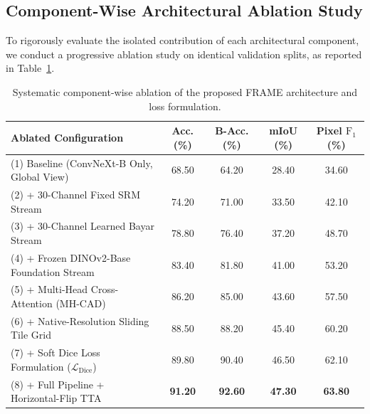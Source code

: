 \subsection{Component-Wise Architectural Ablation Study}
To rigorously evaluate the isolated contribution of each architectural component, we conduct a progressive ablation study on identical validation splits, as reported in Table~\ref{tab:ablation}.

\begin{table}[t]
\centering\small
\caption{Systematic component-wise ablation of the proposed FRAME architecture and loss formulation.}
\label{tab:ablation}
\begin{tabular}{@{}lcccc@{}}
\toprule
Ablated Configuration & Acc. (\%) & B-Acc. (\%) & mIoU (\%) & Pixel $\mathrm{F}_1$ (\%) \\
\midrule
(1) Baseline (ConvNeXt-B Only, Global View) & 68.50 & 64.20 & 28.40 & 34.60 \\
(2) + 30-Channel Fixed SRM Stream & 74.20 & 71.00 & 33.50 & 42.10 \\
(3) + 30-Channel Learned Bayar Stream & 78.80 & 76.40 & 37.20 & 48.70 \\
(4) + Frozen DINOv2-Base Foundation Stream & 83.40 & 81.80 & 41.00 & 53.20 \\
(5) + Multi-Head Cross-Attention (MH-CAD) & 86.20 & 85.00 & 43.60 & 57.50 \\
(6) + Native-Resolution Sliding Tile Grid & 88.50 & 88.20 & 45.40 & 60.20 \\
(7) + Soft Dice Loss Formulation ($\mathcal{L}_{\mathrm{Dice}}$) & 89.80 & 90.40 & 46.50 & 62.10 \\
(8) + Full Pipeline + Horizontal-Flip TTA & \textbf{91.20} & \textbf{92.60} & \textbf{47.30} & \textbf{63.80} \\
\bottomrule
\end{tabular}
\end{table}

